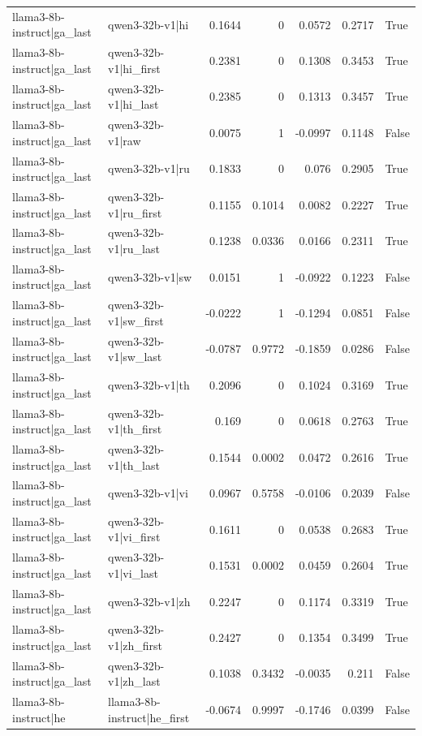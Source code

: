 \begin{table}
\begin{tabular}{l l r r r r l}
llama3-8b-instruct|ga_last & qwen3-32b-v1|hi & 0.1644 & 0 & 0.0572 & 0.2717 & True \\
llama3-8b-instruct|ga_last & qwen3-32b-v1|hi_first & 0.2381 & 0 & 0.1308 & 0.3453 & True \\
llama3-8b-instruct|ga_last & qwen3-32b-v1|hi_last & 0.2385 & 0 & 0.1313 & 0.3457 & True \\
llama3-8b-instruct|ga_last & qwen3-32b-v1|raw & 0.0075 & 1 & -0.0997 & 0.1148 & False \\
llama3-8b-instruct|ga_last & qwen3-32b-v1|ru & 0.1833 & 0 & 0.076 & 0.2905 & True \\
llama3-8b-instruct|ga_last & qwen3-32b-v1|ru_first & 0.1155 & 0.1014 & 0.0082 & 0.2227 & True \\
llama3-8b-instruct|ga_last & qwen3-32b-v1|ru_last & 0.1238 & 0.0336 & 0.0166 & 0.2311 & True \\
llama3-8b-instruct|ga_last & qwen3-32b-v1|sw & 0.0151 & 1 & -0.0922 & 0.1223 & False \\
llama3-8b-instruct|ga_last & qwen3-32b-v1|sw_first & -0.0222 & 1 & -0.1294 & 0.0851 & False \\
llama3-8b-instruct|ga_last & qwen3-32b-v1|sw_last & -0.0787 & 0.9772 & -0.1859 & 0.0286 & False \\
llama3-8b-instruct|ga_last & qwen3-32b-v1|th & 0.2096 & 0 & 0.1024 & 0.3169 & True \\
llama3-8b-instruct|ga_last & qwen3-32b-v1|th_first & 0.169 & 0 & 0.0618 & 0.2763 & True \\
llama3-8b-instruct|ga_last & qwen3-32b-v1|th_last & 0.1544 & 0.0002 & 0.0472 & 0.2616 & True \\
llama3-8b-instruct|ga_last & qwen3-32b-v1|vi & 0.0967 & 0.5758 & -0.0106 & 0.2039 & False \\
llama3-8b-instruct|ga_last & qwen3-32b-v1|vi_first & 0.1611 & 0 & 0.0538 & 0.2683 & True \\
llama3-8b-instruct|ga_last & qwen3-32b-v1|vi_last & 0.1531 & 0.0002 & 0.0459 & 0.2604 & True \\
llama3-8b-instruct|ga_last & qwen3-32b-v1|zh & 0.2247 & 0 & 0.1174 & 0.3319 & True \\
llama3-8b-instruct|ga_last & qwen3-32b-v1|zh_first & 0.2427 & 0 & 0.1354 & 0.3499 & True \\
llama3-8b-instruct|ga_last & qwen3-32b-v1|zh_last & 0.1038 & 0.3432 & -0.0035 & 0.211 & False \\
llama3-8b-instruct|he & llama3-8b-instruct|he_first & -0.0674 & 0.9997 & -0.1746 & 0.0399 & False \\

\end{tabular}
\end{table}
